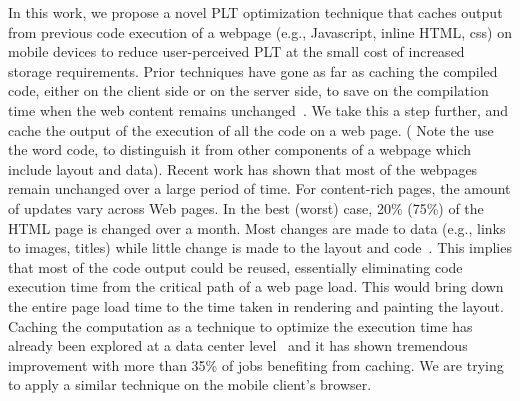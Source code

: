 In this work, we propose a novel PLT optimization technique that caches output
from previous code execution of a webpage (e.g., Javascript, inline
HTML, css) on mobile devices to reduce user-perceived PLT at the small cost
of increased storage requirements.
Prior techniques have gone as far as caching the compiled code, either
on the client side or on the server side, to save on the compilation
time when the web content remains unchanged~\cite{wang2014much}. We
take this a step further, and cache the output of the execution of all
the code on a web page. ( Note the use the word code, to
distinguish it from other components of a webpage which include layout
and data). Recent work has shown that most of the webpages remain
unchanged over a large period of time. For content-rich pages, the
amount of updates vary across Web pages. In the best (worst) case,
20\% (75\%) of the HTML page is changed over a month. Most changes are
made to data (e.g., links to images, titles) while little change is made to
the layout and code~\cite{wang2014much}.  This implies that most of the
code output could be reused, essentially eliminating code execution
time from the critical path of a web page load. This would bring down
the entire page load time to the time taken in rendering and painting the
layout. 
Caching the computation as a technique to optimize the execution time has
already been explored at a data center level~\cite{gunda2010nectar} and it has
shown tremendous improvement with more than 35\% of jobs benefiting from caching.
We are trying to apply a similar technique on the mobile client's browser.